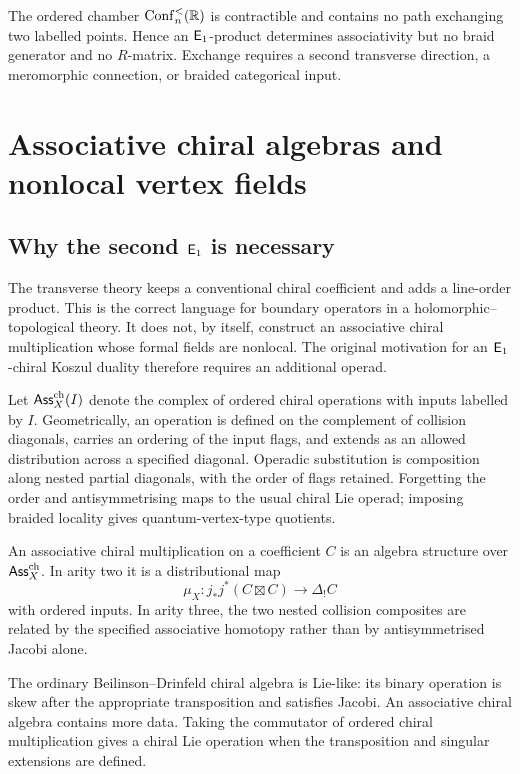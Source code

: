 \begin{nogobox}[title={No-go theorem 4: order does not imply exchange}]
The ordered chamber \(\operatorname{Conf}_n^{<}(\mathbb R)\) is contractible and contains no path exchanging two labelled points.  Hence an \(\mathsf E_1\)-product determines associativity but no braid generator and no \(R\)-matrix.  Exchange requires a second transverse direction, a meromorphic connection, or braided categorical input.
\end{nogobox}

\chapter{Associative chiral algebras and nonlocal vertex fields}

\section{Why the second \(\mathsf E_1\) is necessary}
The transverse theory keeps a conventional chiral coefficient and adds a line-order product.  This is the correct language for boundary operators in a holomorphic--topological theory.  It does not, by itself, construct an associative chiral multiplication whose formal fields are nonlocal.  The original motivation for an \(\mathsf E_1\)-chiral Koszul duality therefore requires an additional operad.

Let \(\mathsf{Ass}^{\mathrm{ch}}_X(I)\) denote the complex of ordered chiral operations with inputs labelled by \(I\).  Geometrically, an operation is defined on the complement of collision diagonals, carries an ordering of the input flags, and extends as an allowed distribution across a specified diagonal.  Operadic substitution is composition along nested partial diagonals, with the order of flags retained.  Forgetting the order and antisymmetrising maps to the usual chiral Lie operad; imposing braided locality gives quantum-vertex-type quotients.

\begin{definition}
An associative chiral multiplication on a coefficient \(C\) is an algebra structure over \(\mathsf{Ass}^{\mathrm{ch}}_X\).  In arity two it is a distributional map
\[
 \mu_X:j_*j^*(C\boxtimes C)\longrightarrow \Delta_!C
\]
with ordered inputs.  In arity three, the two nested collision composites are related by the specified associative homotopy rather than by antisymmetrised Jacobi alone.
\end{definition}

The ordinary Beilinson--Drinfeld chiral algebra is Lie-like: its binary operation is skew after the appropriate transposition and satisfies Jacobi.  An associative chiral algebra contains more data.  Taking the commutator of ordered chiral multiplication gives a chiral Lie operation when the transposition and singular extensions are defined.

